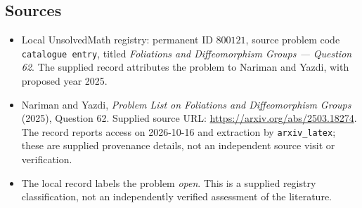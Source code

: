 \documentclass[11pt]{article}
\begin{document}
\subsection{Sources}
\begin{itemize}
\item Local UnsolvedMath registry: permanent ID \(800121\), source problem code \texttt{catalogue entry}, titled \emph{Foliations and Diffeomorphism Groups --- Question 62}. The supplied record attributes the problem to Nariman and Yazdi, with proposed year 2025.
\item Nariman and Yazdi, \emph{Problem List on Foliations and Diffeomorphism Groups} (2025), Question 62. Supplied source URL: \url{https://arxiv.org/abs/2503.18274}. The record reports access on 2026-10-16 and extraction by \texttt{arxiv\_latex}; these are supplied provenance details, not an independent source visit or verification.
\item The local record labels the problem \emph{open}. This is a supplied registry classification, not an independently verified assessment of the literature.
\end{itemize}
\end{document}
